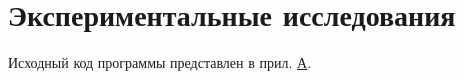 \section{Экспериментальные исследования}



Исходный код программы представлен в прил. \hyperlink{app-a}{А}.

\clearpage

